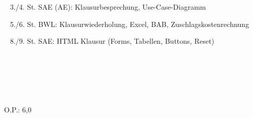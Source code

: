 {{	\textbullet~ 3./4. St. SAE (AE): Klausurbesprechung, Use-Case-Diagramm\par
	\textbullet~ 5./6. St. BWL: Klausurwiederholung, Excel, BAB, Zuschlagskostenrechnung\par
	\textbullet~ 8./9. St. SAE: HTML Klausur (Forms, Tabellen, Buttons, Reset)\par
	\textbullet~ \par
	\textbullet~ \par
	\textbullet~ 
	}{}{O.P.: 6,0}
}{}
\Unterschrift
\newpage

